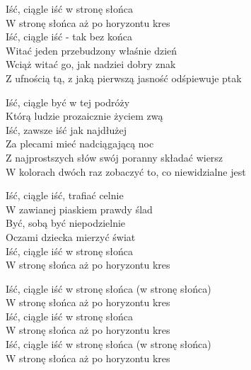 \begin{text}
    Iść, ciągle iść w stronę słońca\\
    W stronę słońca aż po horyzontu kres\\
    Iść, ciągle iść - tak bez końca\\
    Witać jeden przebudzony właśnie dzień\\
    Wciąż witać go, jak nadziei dobry znak\\
    Z ufnością tą, z jaką pierwszą jasność odśpiewuje ptak
	
    Iść, ciągle być w tej podróży\\
    Którą ludzie prozaicznie życiem zwą\\
    Iść, zawsze iść jak najdłużej\\
    Za plecami mieć nadciągającą noc\\
    Z najprostszych słów swój poranny składać wiersz\\
    W kolorach dwóch raz zobaczyć to, co niewidzialne jest
	
    Iść, ciągle iść, trafiać celnie\\
    W zawianej piaskiem prawdy ślad\\
    Być, sobą być niepodzielnie\\
    Oczami dziecka mierzyć świat\\
    Iść, ciągle iść w stronę słońca\\
    W stronę słońca aż po horyzontu kres
	
    Iść, ciągle iść w stronę słońca (w stronę słońca)\\
    W stronę słońca aż po horyzontu kres\\
    Iść, ciągle iść w stronę słońca\\
    W stronę słońca aż po horyzontu kres\\
    Iść, ciągle iść w stronę słońca (w stronę słońca)\\
    W stronę słońca aż po horyzontu kres
\end{text}
